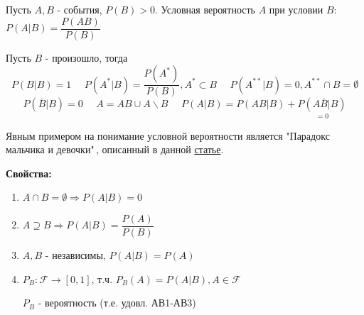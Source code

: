 \begin{definition}
	Пусть $A, B$ - события, $P(B) > 0$. Условная вероятность $A$ при условии $B$: $P(A | B) = \dfrac{P(AB)}{P(B)}$
\end{definition}
\begin{remark}
	Пусть $B$ - произошло, тогда
	\[ P(B|B) = 1 ~~~~~~ P(A^*|B) = \frac{P(A^*)}{P(B)}, A^* \subset B ~~~~~~ P(A^{**} | B) = 0, A^{**} \cap B = \emptyset \]
	\[ P(\bar B | B) = 0 ~~~~~~ A = AB \cup A \backslash B ~~~~~~ P(A|B) = P(AB | B) + \underset{=0}{P(A \bar B | B)} \]
\end{remark}
\begin{figure}[h]
\end{figure}
Явным примером на понимание условной вероятности является "Парадокс мальчика и девочки"\,, описанный в данной \href{https://is.gd/O9vvRh}{статье}.

\textbf{Свойства:}
\begin{enumerate}
	\item $A \cap B = \emptyset \Rightarrow P(A|B) = 0$
	\item $A \supseteq B \Rightarrow P(A|B) = \dfrac{P(A)}{P(B)}$
	\item $A, B$ - независимы, $P(A|B) = P(A)$
	\item $P_B: \mathcal{F} \to [0,1]$, т.ч. $P_B (A) = P(A|B), A \in \mathcal{F}$
	
	$P_B$ - вероятность (т.е. удовл. АВ1-АВ3)
\end{enumerate}


